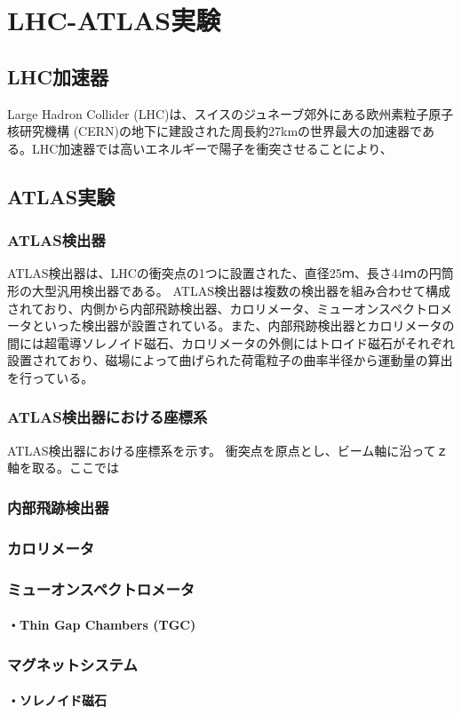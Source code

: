 \chapter{LHC-ATLAS実験}
\label{chapter2}

\section{LHC加速器}
\label{section2-1}

Large Hadron Collider (LHC)は、スイスのジュネーブ郊外にある欧州素粒子原子核研究機構 (CERN)の地下に建設された周長約27kmの世界最大の加速器である。LHC加速器では高いエネルギーで陽子を衝突させることにより、


\section{ATLAS実験}
\label{section2-2}
\subsection{ATLAS検出器}
ATLAS検出器は、LHCの衝突点の1つに設置された、直径25ｍ、長さ44ｍの円筒形の大型汎用検出器である。
ATLAS検出器は複数の検出器を組み合わせて構成されており、内側から内部飛跡検出器、カロリメータ、ミューオンスペクトロメータといった検出器が設置されている。また、内部飛跡検出器とカロリメータの間には超電導ソレノイド磁石、カロリメータの外側にはトロイド磁石がそれぞれ設置されており、磁場によって曲げられた荷電粒子の曲率半径から運動量の算出を行っている。


\subsection{ATLAS検出器における座標系}
ATLAS検出器における座標系を示す。
衝突点を原点とし、ビーム軸に沿ってｚ軸を取る。ここでは

\subsection{内部飛跡検出器}

\subsection{カロリメータ}

\subsection{ミューオンスペクトロメータ}
\label{section2-2-4}

\subsubsection{・Thin Gap Chambers (TGC)}



\subsection{マグネットシステム}
\subsubsection{・ソレノイド磁石}




